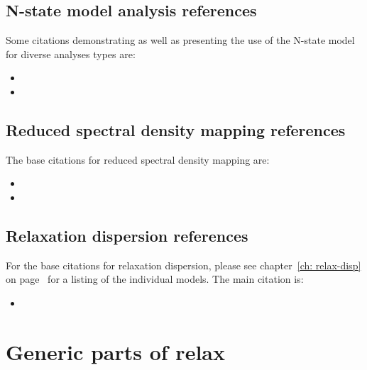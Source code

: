 
\subsection*{N-state model analysis references}

Some citations demonstrating as well as presenting the use of the N-state model for diverse analyses types are:

\begin{itemize}
\item {}
\item {}
\end{itemize}



\subsection*{Reduced spectral density mapping references}

The base citations for reduced spectral density mapping are:

\begin{itemize}
\item {}
\item {}
\end{itemize}



\subsection*{Relaxation dispersion references}

For the base citations for relaxation dispersion, please see chapter~\ref{ch: relax-disp} on page~\pageref{ch: relax-disp} for a listing of the individual models.
The main citation is:

\begin{itemize}
\item {}
\end{itemize}




\section*{Generic parts of relax}

